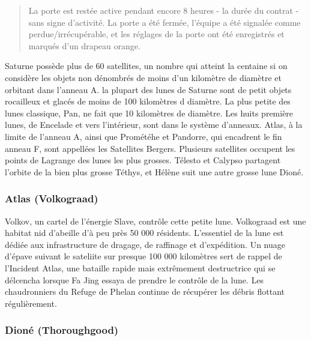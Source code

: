 \begin{quotation}
                                                                     La porte est restée active pendant encore 8 heures - la durée du contrat - sans signe d'activité. La porte a été fermée, l'équipe a été signalée comme perdue/irrécupérable, et les réglages de la porte ont été enregistrés et marqués d'un drapeau orange. \end{quotation} 





                                                                     Saturne possède plus de 60 satellites, un nombre qui atteint la centaine si on considère les objets non dénombrés de moins d'un kilomètre de diamètre et orbitant dans l'anneau A. la plupart des lunes de Saturne sont de petit objets rocailleux et glacés de moins de 100 kilomètres d diamètre. La plus petite des lunes classique, Pan, ne fait que 10 kilomètres de diamètre. Les huits première lunes, de Encelade et vers l'intérieur, sont dans le système d'anneaux. Atlas, à la limite de l'anneau A, ainsi que Prométéhe et Pandorre, qui encadrent le fin anneau F, sont appellées les Satellites Bergers. Plusieurs satellites occupent les points de Lagrange des lunes les plus grosses. Télesto et Calypso partagent l'orbite de la bien plus grosse Téthys, et Hélène suit une autre grosse lune Dioné. 

                                                                     \subsubsection{Atlas (Volkograad)} \label{sec:atlas-volkograad} 

                                                                     Volkov, un cartel de l'énergie Slave, contrôle cette petite lune. Volkograad est une habitat nid d'abeille d'à peu près 50 000 résidents. L'essentiel de la lune est dédiée aux infrastructure de dragage, de raffinage et d'expédition. Un nuage d'épave suivant le sateliite sur presque 100 000 kilomètres sert de rappel de l'Incident Atlas, une bataille rapide mais extrêmement destructrice qui se délcencha lorsque Fa Jing essaya de prendre le contrôle de la lune. Les chaudronniers du Refuge de Phelan continue de récupérer les débris flottant régulièrement. 

                                                                     \subsubsection{Dioné (Thoroughgood)} \label{sec:dione-thoroughgood} 

